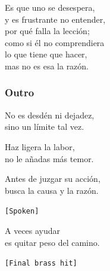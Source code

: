 Es que uno se desespera,\\
y es frustrante no entender,\\
por qué falla la lección;\\
como si él no comprendiera\\
lo que tiene que hacer,\\
mas no es esa la razón.

\subsubsection{Outro}\label{outro-12}

No es desdén ni dejadez,\\
sino un límite tal vez.

Haz ligera la labor,\\
no le añadas más temor.

Antes de juzgar su acción,\\
busca la causa y la razón.

\texttt{{[}Spoken{]}}

A veces ayudar\\
es quitar peso del camino.

\texttt{{[}Final\ brass\ hit{]}}
